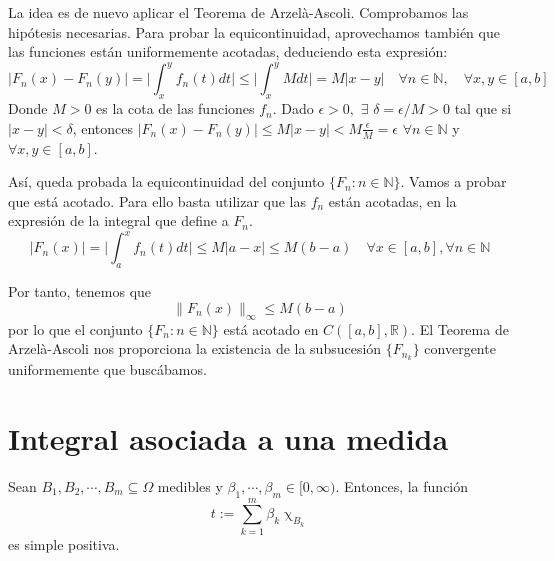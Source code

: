 \begin{sol}
La idea es de nuevo aplicar el Teorema de Arzelà-Ascoli. Comprobamos las hipótesis necesarias. Para probar la equicontinuidad, aprovechamos también que las funciones están uniformemente acotadas, deduciendo esta expresión:
$$|F_n(x) - F_n(y)| = \bigg|\int_{x}^{y} f_n(t) dt \bigg| \leq \bigg|\int_{x}^{y} Mdt \bigg| = M|x-y| \quad \forall n \in \mathbb{N}, \quad \forall x,y \in [a,b] $$
Donde $M > 0$ es la cota de las funciones $f_n$. Dado $\epsilon > 0,$
$\exists$ $\delta = \epsilon/M > 0$ tal que si $|x-y| < \delta$,
entonces
$|F_n(x) - F_n(y)| \leq M|x-y|<M \frac{\epsilon}{M} =
\epsilon$ $\forall n \in \mathbb{N}$ y $\forall x,y \in [a,b]$.

Así, queda probada la equicontinuidad del conjunto
$\{F_n : n \in \mathbb{N}\}$. Vamos a probar que está acotado. Para
ello basta utilizar que las $f_n$ están acotadas, en la expresión de
la integral que define a $F_n$.
\[|F_n(x)| = \bigg|\int_{a}^{x} f_n(t)dt \bigg| \leq M|a-x| \leq M(b-a) \quad \forall x \in [a,b], \forall n \in \mathbb{N}\]

Por tanto, tenemos que $$\|F_n(x)\|_\infty \leq M(b-a)$$ por lo que el
conjunto $\{F_n : n \in \mathbb{N}\}$ está acotado en
$C([a,b],\mathbb{R})$. El Teorema de Arzelà-Ascoli nos proporciona la
existencia de la subsucesión $\{F_{n_k}\}$ convergente uniformemente
que buscábamos.
\end{sol}



\newpage



\section{Integral asociada a una medida}

\begin{ejer} Sean $B_1,B_2,\cdots,B_m \subseteq \Omega$ medibles y $\beta_1,\cdots,\beta_m\in[0,\infty)$. Entonces, la función $$t:= \sum_{k=1}^m \beta_k \upchi_{B_k}$$  es simple positiva.

\end{ejer}


